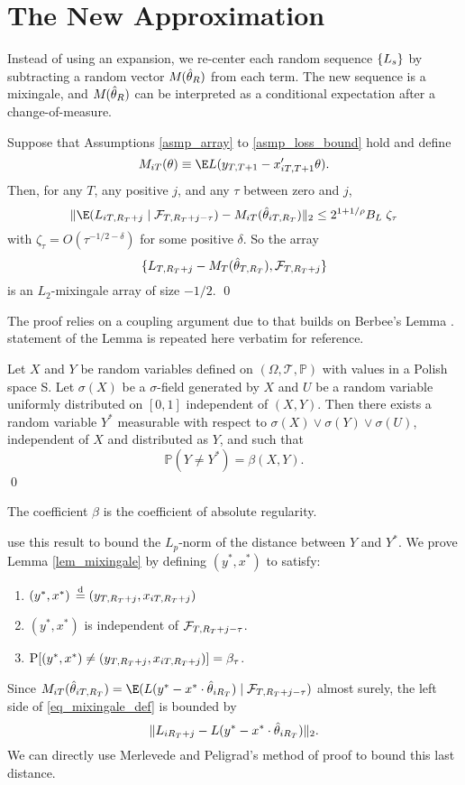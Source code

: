 \documentclass[11pt]{article} \def\baselinestretch{1.08}
\begin{document}
\section{The New Approximation} \label{sec_mr}
Instead of using an expansion, we re-center each random sequence
$\{L_{{}{s}}\}$ by subtracting a random vector $M_{}(\hat \theta_{{}{R}})$ from each term.
The new sequence is a mixingale, and $M_{}(\hat \theta_{{}{R}})$ can be interpreted as a
conditional expectation after a change-of-measure.
  
\begin{lem} \label{lem_mixingale}
  Suppose that Assumptions \ref{asmp_array} to \ref{asmp_loss_bound}
  hold and define 
  \[
  \mmT{i}{\theta} \equiv \E L(\yT{T+1} - \xT{i}{T+1}'\theta).
  \]
  Then, for any $T$, any positive $j$, and any $\tau$ between zero and $j$,
  \begin{equation}
    \label{eq_mixingale_def}
    \| \E(\fT{i}{R_T+j} \mid \FT{R_T+j-\tau}) - \mmrT{i} \|_2 \leq 
     2^{1 + 1/\rho} B_L \; \zeta_{\tau}
  \end{equation}
  with $\zeta_\tau = O(\tau^{-1/2-\delta})$ for some positive
  $\delta$.  So the array 
  \[
  \{L_{{}T,{R_T+j}} - M_{{}T}({\hat \theta_{{}T,{R_T}}}), \mathcal F_{T,{R_T+j}}\}
  \]
  is an $L_2$-mixingale array of size $-1/2$. 
  \qed
\end{lem}

The proof relies on a coupling argument due to
 that builds on Berbee's Lemma
\cite{berbee_random_1979}.  
statement of the Lemma is repeated here verbatim for reference.
\begin{BL}
  Let $X$ and $Y$ be random variables defined on $(\Omega, \mathcal T,
  \mathbb P)$ with values in a Polish space S.  Let $\sigma(X)$ be a
  $\sigma$-field generated by $X$ and $U$ be a random variable
  uniformly distributed on $[0,1]$ independent of $(X,Y)$.  Then there
  exists a random variable $Y^*$ measurable with respect to $\sigma(X)
  \vee \sigma(Y) \vee \sigma(U)$, independent of $X$ and distributed
  as $Y$, and such that
  \[
  \mathbb P(Y \neq Y^*) = \beta(X,Y).
  \] \qed
\end{BL}
The coefficient $\beta$ is the coefficient of absolute regularity.

 use this result to bound the
$L_p$-norm of the distance between $Y$ and $Y^*$. We prove Lemma
\ref{lem_mixingale} by defining $(y^*, x^*)$ to satisfy:
\begin{enumerate}
\item $(y^*, x^*) \operatorname{{}\overset{d}{=}{}} (y_{T,{R_T+j}}, x_{{i}T,{R_T+j}})$
\item $(y^*, x^*)$ is independent of $\mathcal F_{T,{R_T+j-\tau}}$.
\item $\operatorname{P}[(y^*, x^*) \neq (y_{T,{R_T+j}}, x_{{i}T,{R_T+j}})] = \beta_\tau$.
\end{enumerate}
Since $\mmrT{i} = \E(L(y^* - x^* \cdot \b{i}{R_T}) \mid
\FT{R_T+j-\tau})$ almost surely, the left side of
\eqref{eq_mixingale_def} is bounded by
\[
  \| L_{{i}{R_T+j}} - L(y^* - x^* \cdot \hat \theta_{{i}{R_T}}) \|_2.
\]
We can directly use Merlevede and Peligrad's method of
proof to bound this last distance.
\end{document}
